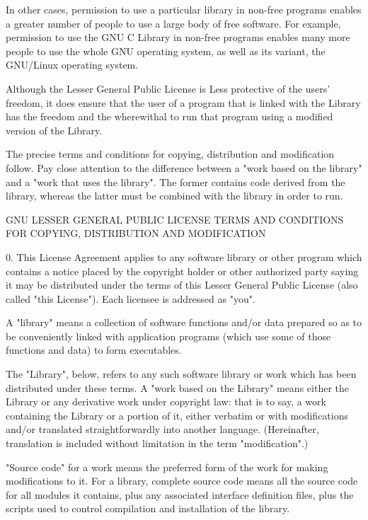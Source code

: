 \begin{DoxyCode}
  In other cases, permission to use a particular library in non-free
programs enables a greater number of people to use a large body of
free software.  For example, permission to use the GNU C Library in
non-free programs enables many more people to use the whole GNU
operating system, as well as its variant, the GNU/Linux operating
system.

  Although the Lesser General Public License is Less protective of the
users' freedom, it does ensure that the user of a program that is
linked with the Library has the freedom and the wherewithal to run
that program using a modified version of the Library.

  The precise terms and conditions for copying, distribution and
modification follow.  Pay close attention to the difference between a
"work based on the library" and a "work that uses the library".  The
former contains code derived from the library, whereas the latter must
be combined with the library in order to run.

GNU LESSER GENERAL PUBLIC LICENSE
TERMS AND CONDITIONS FOR COPYING, DISTRIBUTION AND MODIFICATION

  0. This License Agreement applies to any software library or other
program which contains a notice placed by the copyright holder or
other authorized party saying it may be distributed under the terms of
this Lesser General Public License (also called "this License").
Each licensee is addressed as "you".

  A "library" means a collection of software functions and/or data
prepared so as to be conveniently linked with application programs
(which use some of those functions and data) to form executables.

  The "Library", below, refers to any such software library or work
which has been distributed under these terms.  A "work based on the
Library" means either the Library or any derivative work under
copyright law: that is to say, a work containing the Library or a
portion of it, either verbatim or with modifications and/or translated
straightforwardly into another language.  (Hereinafter, translation is
included without limitation in the term "modification".)

  "Source code" for a work means the preferred form of the work for
making modifications to it.  For a library, complete source code means
all the source code for all modules it contains, plus any associated
interface definition files, plus the scripts used to control compilation
and installation of the library.


\end{DoxyCode}
